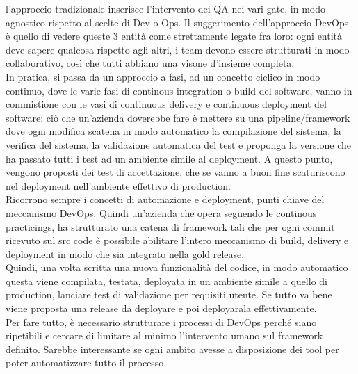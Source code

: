 \documentclass{article}
\begin{document}
l'approccio tradizionale inserisce l'intervento dei QA nei vari gate, in modo agnostico rispetto al scelte di Dev o Ops. Il suggerimento dell'approccio DevOps è quello di vedere queste 3 entità come strettamente legate fra loro: ogni entità deve sapere qualcosa rispetto agli altri, i team devono essere strutturati in modo collaborativo, così che tutti abbiano una visone d'insieme completa.\\ In pratica, si passa da un approccio a fasi, ad un concetto ciclico in modo continuo, dove le varie fasi di continous integration o build del software, vanno in commistione con le vasi di continuous delivery e continuous deployment del software: ciò che un'azienda doverebbe fare è mettere su una pipeline/framework dove ogni modifica scatena in modo automatico la compilazione del sistema, la verifica del sistema, la validazione automatica del test e proponga la versione che ha passato tutti i test ad un ambiente simile al deployment. A questo punto, vengono proposti dei test di accettazione, che se vanno a buon fine scaturiscono nel deployment nell'ambiente effettivo di production.\\ Ricorrono sempre i concetti di automazione e deployment, punti chiave del meccanismo DevOps. Quindi un'azienda che opera seguendo le continous practicings, ha strutturato una catena di framework tali che per ogni commit ricevuto sul src code è possibile abilitare l'intero meccanismo di build, delivery e deployment in modo che sia integrato nella gold release.\\ Quindi, una volta scritta una nuova funzionalità del codice, in modo automatico questa viene compilata, testata, deployata in un ambiente simile a quello di production, lanciare test di validazione per requisiti utente. Se tutto va bene viene proposta una release da deployare e poi deployarala effettivamente.\\ Per fare tutto, è necessario strutturare i processi di DevOps perché siano ripetibili e cercare di limitare al minimo l'intervento umano sul framework definito. Sarebbe interessante se ogni ambito avesse a disposizione dei tool per poter automatizzare tutto il processo.
\end{document}
